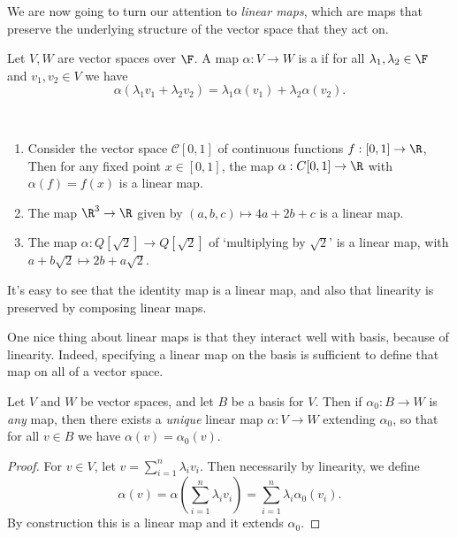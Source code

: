 We are now going to turn our attention to \emph{linear maps}, which are maps that preserve the underlying structure of the vector space that they act on.

\begin{definition}
    Let $V, W$ are vector spaces over $\F$.
    A map $\alpha: V \rightarrow W$ is a  if for all $\lambda_1, \lambda_2 \in \F$ and $v_1, v_2 \in V$ we have 
    $$
    \alpha(\lambda_1 v_1 + \lambda_2 v_2) = \lambda_1\alpha(v_1) + \lambda_2 \alpha(v_2).
    $$
\end{definition}

\begin{example}~
    \vspace{-1.5\baselineskip}
    \begin{enumerate}[label=(\roman*)]
        \item Consider the vector space $\mathcal{C}[0, 1]$ of continuous functions $f:[0, 1] \rightarrow \R$, Then for any fixed point $x \in [0, 1]$, the map $\alpha: C[0, 1] \rightarrow \R$ with $\alpha(f) = f(x)$ is a linear map.
        \item The map $\R^3 \rightarrow \R$ given by $(a, b, c) \mapsto 4a + 2b + c$ is a linear map.
        \item The map $\alpha: Q[\sqrt{2}] \rightarrow Q[\sqrt{2}]$ of `multiplying by $\sqrt{2}$' is a linear map, with $a + b \sqrt{2} \mapsto 2b + a \sqrt{2}$.
    \end{enumerate}
\end{example}

It's easy to see that the identity map is a linear map, and also that linearity is preserved by composing linear maps.

One nice thing about linear maps is that they interact well with basis, because of linearity. Indeed, specifying a linear map on the basis is sufficient to define that map on all of a vector space.

\begin{lemma}\label{lemma:extend-map}
    Let $V$ and $W$ be vector spaces, and let $B$ be a basis for $V$. Then if $\alpha_0: B \rightarrow W$ is \emph{any} map, then there exists a \emph{unique} linear map $\alpha: V \rightarrow W$ extending $\alpha_0$, so that for all $v \in B$ we have $\alpha(v) = \alpha_0(v)$.
\end{lemma}
\begin{proof}
    For $v \in V$, let $v = \sum_{i = 1}^n \lambda_i v_i$. Then necessarily by linearity, we define
    $$
    \alpha(v) = \alpha\left(\sum_{i = 1}^n \lambda_i v_i\right) = \sum_{i = 1}^n \lambda_i \alpha_0 (v_i).
    $$
    By construction this is a linear map and it extends $\alpha_0$.
\end{proof}

